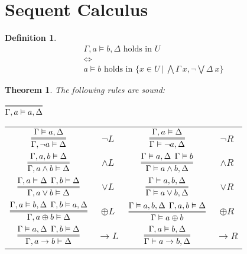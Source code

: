 \documentclass{article}
\theoremstyle{sltheorem}
\newtheorem{definition}{Definition}
\newtheorem{theorem}{Theorem}
\begin{document}
\section{Sequent Calculus}
\begin{definition}
	\begin{gather*}
		\Gamma,a\vDash b,\Delta\text{ holds in }U\\
		\Leftrightarrow\\
		a\vDash b\text{ holds in }\{x\in U\:|\:\bigwedge\Gamma\:x, \neg\bigvee\Delta\:x\}
	\end{gather*}
\end{definition}
\begin{theorem}
	The following rules are sound:
	\begin{center}
		$\infer={\Gamma, a \vDash a, \Delta}{}$\\
		{\renewcommand{\arraystretch}{3}
		\begin{tabular}{c c c c}
			$\vcenter{\infer={\Gamma,\neg a\vDash \Delta}{\Gamma\vDash a, \Delta}}$
			 & $\neg L$
			 & $\vcenter{\infer={\Gamma\vDash \neg a, \Delta}{\Gamma, a\vDash \Delta}}$
			 & $\neg R$                                                                                        \\
			$\vcenter{\infer={\Gamma, a\wedge b\vDash \Delta}{\Gamma, a, b\vDash \Delta}}$
			 & $\wedge L$
			 & $\vcenter{\infer={\Gamma\vDash a\wedge b, \Delta}{\Gamma\vDash a, \Delta\:\: \Gamma\vDash b}}$
			 & $\wedge R$                                                                                      \\
			$\vcenter{\infer={\Gamma, a\vee b\vDash \Delta}{\Gamma,a\vDash \Delta\:\:\Gamma,b\vDash\Delta}}$
			 & $\vee L$
			 & $\vcenter{\infer={\Gamma\vDash a\vee b,\Delta}{\Gamma\vDash a,b,\Delta}}$
			 & $\vee R$                                                                                        \\
			$\vcenter{\infer={\Gamma, a\oplus b\vDash\Delta}{\Gamma, a\vDash b, \Delta\:\:\Gamma, b\vDash a,\Delta}}$
			 & $\oplus L$
			 & $\vcenter{\infer={\Gamma\vDash a\oplus b}{\Gamma\vDash a,b,\Delta\:\:\Gamma,a,b\vDash \Delta}}$
			 & $\oplus R$                                                                                      \\
			$\vcenter{\infer={\Gamma, a\to b\vDash \Delta}{\Gamma\vDash a,\Delta\:\:\Gamma, b\vDash \Delta}}$
			 & $\to L$
			 & $\vcenter{\infer={\Gamma\vDash a\to b, \Delta}{\Gamma,a\vDash b,\Delta}}$
			 & $\to R$
		\end{tabular}
		}
	\end{center}
\end{theorem}
\end{document}
